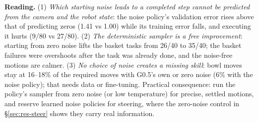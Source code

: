 \documentclass[10pt,a4paper]{article}
\begin{document}
\noindent\textbf{Reading.} (1) \emph{Which starting noise leads to a completed step cannot be predicted from the camera and the robot state}: the noise policy's validation error rises above that of predicting zeros (1.41 vs 1.00) while its training error falls, and executing it hurts (9/80 vs 27/80). (2) \emph{The deterministic sampler is a free improvement}: starting from zero noise lifts the basket tasks from 26/40 to 35/40; the basket failures were overshoots after the task was already done, and the noise-free motions are calmer. (3) \emph{No choice of noise creates a missing skill}: bowl moves stay at 16--18\% of the required moves with G0.5's own or zero noise (6\% with the noise policy); that needs data or fine-tuning. Practical consequence: run the policy's sampler from zero noise (or low temperature) for precise, settled motions, and reserve learned noise policies for steering, where the zero-noise control in \S\ref{sec:res-steer} shows they carry real information.
\end{document}
